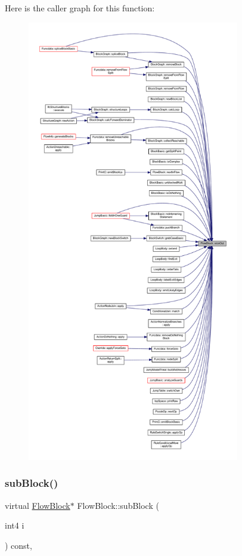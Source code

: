 Here is the caller graph for this function\+:
\nopagebreak
\begin{figure}[H]
\begin{center}
\leavevmode
\includegraphics[height=550pt]{class_flow_block_abf4424ddc9e448fcd52e72ebe9fb8a2b_icgraph}
\end{center}
\end{figure}
\mbox{\label{class_flow_block_a42070515fd8db6cc23916b359e259f4e}} 
\subsubsection{\texorpdfstring{subBlock()}{subBlock()}}
{\footnotesize\ttfamily virtual \mbox{\hyperlink{class_flow_block}{Flow\+Block}}$\ast$ Flow\+Block\+::sub\+Block (\begin{DoxyParamCaption}\item[{int4}]{i }\end{DoxyParamCaption}) const\hspace{0.3cm}{\ttfamily [inline]}, {\ttfamily [virtual]}}



